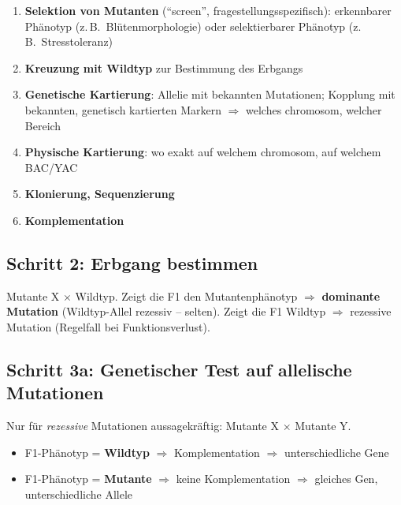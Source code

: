 \begin{enumerate}
    \item \textbf{Selektion von Mutanten} (``screen'', fragestellungsspezifisch): erkennbarer Phänotyp (z.\,B.\ Blütenmorphologie) oder selektierbarer Phänotyp (z.\,B.\ Stresstoleranz)
    \item \textbf{Kreuzung mit Wildtyp} zur Bestimmung des Erbgangs
    \item \textbf{Genetische Kartierung}: Allelie mit bekannten Mutationen; Kopplung mit bekannten, genetisch kartierten Markern $\Rightarrow$ welches \gls{chromosom}, welcher Bereich
    \item \textbf{Physische Kartierung}: wo exakt auf welchem \gls{chromosom}, auf welchem BAC/YAC
    \item \textbf{Klonierung, Sequenzierung}
    \item \textbf{Komplementation}
\end{enumerate}

\subsection*{Schritt 2: Erbgang bestimmen}\label{subsec:schritt-2:-erbgang-bestimmen}
Mutante X $\times$ Wildtyp.
Zeigt die F1 den Mutantenphänotyp $\Rightarrow$ \textbf{dominante Mutation} (Wildtyp-Allel rezessiv -- selten).
Zeigt die F1 Wildtyp $\Rightarrow$ rezessive Mutation (Regelfall bei Funktionsverlust).


\subsection*{Schritt 3a: Genetischer Test auf allelische Mutationen}\label{subsec:schritt-3a:-genetischer-test-auf-allelische-mutationen}
Nur für \emph{rezessive} Mutationen aussagekräftig: Mutante X $\times$ Mutante Y.
\begin{itemize}
    \item F1-Phänotyp = \textbf{Wildtyp} $\Rightarrow$ Komplementation $\Rightarrow$ unterschiedliche Gene
    \item F1-Phänotyp = \textbf{Mutante} $\Rightarrow$ keine Komplementation $\Rightarrow$ gleiches Gen, unterschiedliche Allele
\end{itemize}


